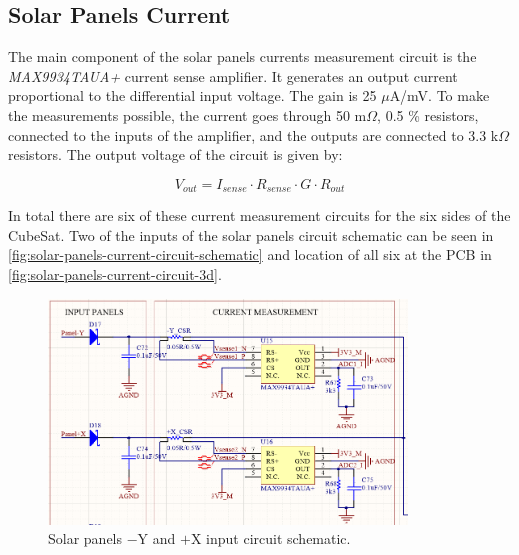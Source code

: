 \subsection{Solar Panels Current}

The main component of the solar panels currents measurement circuit is the \textit{MAX9934TAUA+} current sense amplifier. It generates an output current proportional to the differential input voltage. The gain is 25 $\mu$A/mV. To make the measurements possible, the current goes through 50 m$\Omega$, 0.5 \% resistors, connected to the inputs of the amplifier, and the outputs are connected to 3.3 k$\Omega$ resistors. The output voltage of the circuit is given by:

\begin{equation}
V_{out} = I_{sense} \cdot R_{sense} \cdot G \cdot R_{out}
\end{equation}

In total there are six of these current measurement circuits for the six sides of the CubeSat.
Two of the inputs of the solar panels circuit schematic can be seen in \autoref{fig:solar-panels-current-circuit-schematic} and location of all six at the PCB in \autoref{fig:solar-panels-current-circuit-3d}.

\begin{figure}[!ht]
    \begin{center}
        \includegraphics[width=0.85\textwidth]{figures/solar-panels-current-circuit-schematic.png}
        \caption{Solar panels $-$Y and $+$X input circuit schematic.}
        \label{fig:solar-panels-current-circuit-schematic}
    \end{center}
\end{figure}

